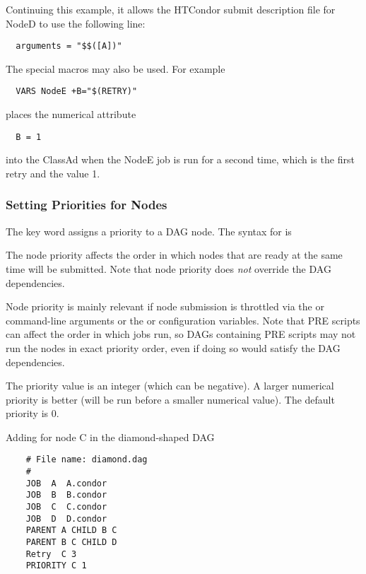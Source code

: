 Continuing this example,
it allows the HTCondor submit description file for NodeD to use
the following line:
\begin{verbatim}
  arguments = "$$([A])"
\end{verbatim}

The special macros may also be used.
For example
\begin{verbatim}
  VARS NodeE +B="$(RETRY)"
\end{verbatim}
places the numerical attribute
\begin{verbatim}
  B = 1
\end{verbatim}
into the ClassAd when the NodeE job is run for a second time,
which is the first retry and the value 1. 

\subsubsection{Setting Priorities for Nodes}

The  key word assigns a priority to a DAG node.
The syntax for  is

  

The node priority affects the order in which nodes that are ready
at the same time will be submitted.  Note that node priority does
\emph{not} override the DAG dependencies.

Node priority is mainly relevant if
node submission is throttled via the  or 
command-line arguments or the  or
 configuration variables.  Note that PRE
scripts can affect the order in which jobs run, so DAGs containing
PRE scripts may not run the nodes in exact priority order, even if
doing so would satisfy the DAG dependencies.

The priority value is an integer (which can be negative).  A larger
numerical priority is better (will be run before a smaller numerical
value).  The default priority is 0.

Adding  for node C in the diamond-shaped
DAG
\footnotesize
\begin{verbatim}
    # File name: diamond.dag
    #
    JOB  A  A.condor 
    JOB  B  B.condor 
    JOB  C  C.condor	
    JOB  D  D.condor
    PARENT A CHILD B C
    PARENT B C CHILD D
    Retry  C 3
    PRIORITY C 1
\end{verbatim}
\normalsize

